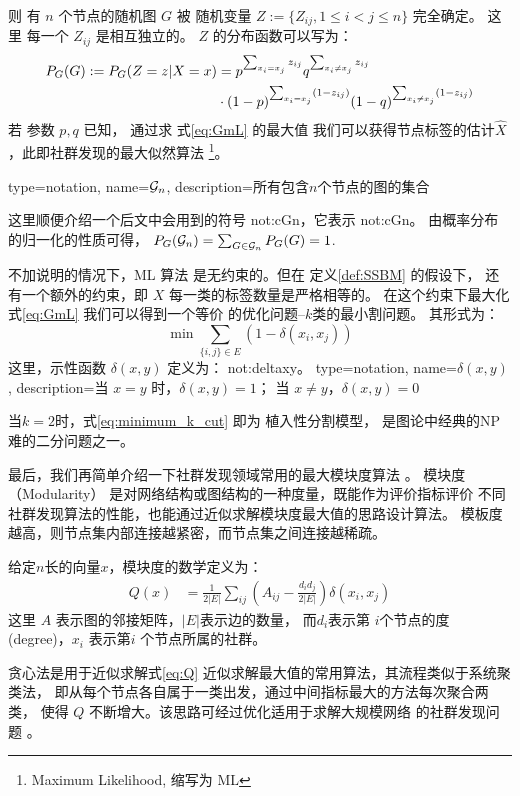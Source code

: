 则 有 $n$ 个节点的随机图 $G$ 
被 
随机变量 $Z:=\{Z_{ij}, 1\leq i<j\leq n\}$ 完全确定。
这里 每一个 $Z_{ij}$ 是相互独立的。
$Z$ 的分布函数可以写为：
\begin{align}
P_G(G):=P_G(Z = z| X=x) &= p^{\sum_{x_i = x_j}
z_{ij}}q^{\sum_{x_i \neq x_j} z_{ij}} \notag\\
&\cdot (1-p)^{\sum_{x_i = x_j} (1-z_{ij})}
(1-q)^{\sum_{x_i \neq x_j} (1-z_{ij})} \label{eq:GmL}
\end{align}
若 参数 $p, q$ 已知，
通过求
式\eqref{eq:GmL} 的最大值
我们可以获得节点标签的估计$\hat{X}$，此即社群发现的最大似然算法
\footnote{Maximum Likelihood, 缩写为 ML}。

{
  type=notation,
  name={$\mathcal{G}_n$},
  description={所有包含$n$个节点的图的集合}
}

这里顺便介绍一个后文中会用到的符号 \gls{not:cGn}，它表示
\glsdesc{not:cGn}。
由概率分布的归一化的性质可得，
$P_G(\mathcal{G}_n) = \sum_{G\in \mathcal{G}_n}P_G(G)=1$.

不加说明的情况下，ML 算法 是无约束的。但在
定义\ref{def:SSBM} 的假设下，
还有一个额外的约束，即 $X$ 每一类的标签数量是严格相等的。
在这个约束下最大化式\eqref{eq:GmL} 我们可以得到一个等价
的优化问题--$k$类的最小割问题。
其形式为：
\begin{equation}\label{eq:minimum_k_cut}
  \min \sum_{ \{i,j\} \in E} (1-\delta(x_i, x_j))
\end{equation}
这里，示性函数 $\delta(x,y)$ 定义为：
\glsdesc{not:deltaxy}。
{
  type=notation,
  name={$\delta(x,y)$},
  description={当 $x=y$ 时，$\delta(x,y) = 1$； 当 $x\neq y$，$\delta(x,y)=0$}
}

当$k=2$时，式\eqref{eq:minimum_k_cut} 即为 植入性分割模型，
是图论中经典的NP难的二分问题之一。

最后，我们再简单介绍一下社群发现领域常用的最大模块度算法
\cite{newman2006modularity}。
模块度（Modularity）
是对网络结构或图结构的一种度量，既能作为评价指标评价
不同社群发现算法的性能，也能通过近似求解模块度最大值的思路设计算法。
模板度越高，则节点集内部连接越紧密，而节点集之间连接越稀疏。

给定$n$长的向量$x$，模块度的数学定义为：
\begin{align}\label{eq:Q}
  Q(x) &= \frac{1}{2 |E|} \sum_{ij} (A_{ij} - \frac{d_i d_j}{2 |E|}) \delta(x_i, x_j)
\end{align}
这里 $A$ 表示图的邻接矩阵，$|E|$表示边的数量，
而$d_i$表示第
$i$个节点的度(degree)，$x_i$ 表示第$i$
个节点所属的社群。

贪心法是用于近似求解式\eqref{eq:Q}
近似求解最大值的常用算法，其流程类似于系统聚类法，
即从每个节点各自属于一类出发，通过中间指标最大的方法每次聚合两类，
使得 $Q$ 不断增大。该思路可经过优化适用于求解大规模网络
的社群发现问题 \cite{clauset2004finding}。


